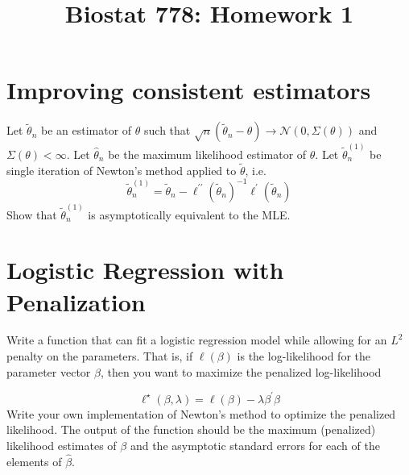 \documentclass{article}
\title{Biostat 778: Homework 1}
\begin{document}
\maketitle

\section{Improving consistent estimators}

Let $\tilde{\theta}_n$ be an estimator of $\theta$ such that $\sqrt{n}(\tilde{\theta}_n-\theta)\rightarrow\mathcal{N}(0, \Sigma(\theta))$ and $\Sigma(\theta)<\infty$. Let $\hat{\theta}_n$ be the maximum likelihood estimator of $\theta$. Let $\tilde{\theta}^{(1)}_n$ be single iteration of Newton's method applied to $\tilde{\theta}$, i.e.
\[
\tilde{\theta}^{(1)}_n = \tilde{\theta}_n -\ell^{\prime\prime}(\tilde{\theta}_n)^{-1}\ell^\prime(\tilde{\theta}_n)
\]
Show that $\tilde{\theta}^{(1)}_n$ is asymptotically equivalent to the MLE.


\section{Logistic Regression with Penalization}

Write a function that can fit a logistic regression model while
allowing for an $L^2$ penalty on the parameters. That is, if
$\ell(\beta)$ is the log-likelihood for the parameter vector $\beta$,
then you want to maximize the penalized log-likelihood

\[
\ell^\star(\beta,\lambda) = \ell(\beta) - \lambda\beta^\prime\beta
\]
Write your own implementation of Newton's method to optimize the
penalized likelihood. The output of the function should be the maximum
(penalized) likelihood estimates of $\beta$ and the asymptotic
standard errors for each of the elements of $\hat{\beta}$.
\end{document}

